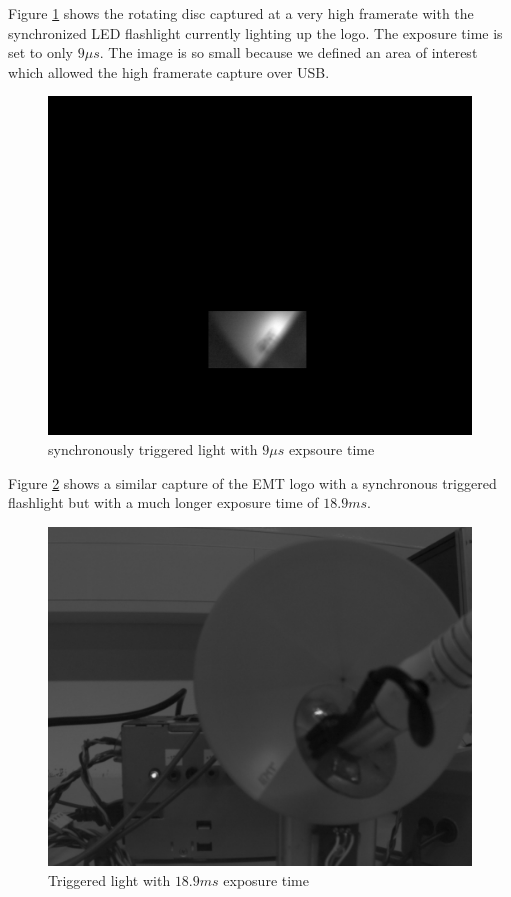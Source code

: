 \documentclass[
a4paper,     %
12pt         %
]{scrartcl}  %
\begin{document}
Figure \ref{fig:triggered_9us} shows the rotating disc captured at a very high framerate with the synchronized LED flashlight currently lighting up the logo.
The exposure time is set to only $9\mu s$.
The image is so small because we defined an area of interest which allowed the high framerate capture over USB.

\begin{figure}[ht!]
 \centering
 \includegraphics[width=.8\linewidth]{./Bildg_Messtechnik_Lab/SensorDynamics/triggered_9us.png}
 \caption{synchronously triggered light with $9\mu s$ expsoure time}
 \label{fig:triggered_9us}
\end{figure}

Figure \ref{fig:triggered_light_189ms_exp} shows a similar capture of the EMT logo with a synchronous triggered flashlight but with a much longer exposure time of $18.9ms$.

\begin{figure}[ht!]
 \centering
 \includegraphics[width=.8\linewidth]{./Bildg_Messtechnik_Lab/SensorDynamics/triggered_light_18_9ms_exp.png}
 \caption{Triggered light with $18.9ms$ exposure time}
 \label{fig:triggered_light_189ms_exp}
\end{figure}
\end{document}

